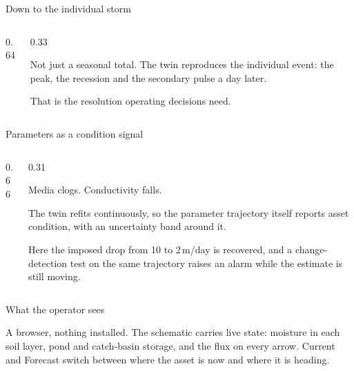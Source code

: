 \documentclass[aspectratio=169, 10pt]{beamer}
\begin{document}
\begin{frame}{Down to the individual storm}
  \begin{columns}[c,onlytextwidth]
    \begin{column}{0.64\textwidth}
    \end{column}
    \begin{column}{0.33\textwidth}
      {\footnotesize Not just a seasonal total. The twin reproduces the
      \alert{individual event}: the peak, the recession and the secondary
      pulse a day later.

      \vspace{0.6em}
      That is the resolution operating decisions need.}
    \end{column}
  \end{columns}
\end{frame}

\begin{frame}{Parameters as a condition signal}
  \begin{columns}[c,onlytextwidth]
    \begin{column}{0.66\textwidth}
    \end{column}
    \begin{column}{0.31\textwidth}
      {\footnotesize Media clogs. Conductivity falls.

      \vspace{0.6em}
      The twin refits continuously, so the \alert{parameter trajectory itself}
      reports asset condition, with an uncertainty band around it.

      \vspace{0.6em}
      Here the imposed drop from 10 to 2\,m/day is recovered, and a
      change-detection test on the same trajectory raises an alarm while the
      estimate is still moving.}
    \end{column}
  \end{columns}
\end{frame}

\begin{frame}{What the operator sees}
  \centering
  \setlength{\figslotmaxht}{0.74\textheight}
  \vspace{-0.4em}
  \parbox{\textwidth}{\scriptsize A browser, nothing installed. The schematic
  carries \alert{live state}: moisture in each soil layer, pond and catch-basin
  storage, and the flux on every arrow. \alert{Current} and \alert{Forecast}
  switch between where the asset is now and where it is heading.}
\end{frame}
\end{document}
